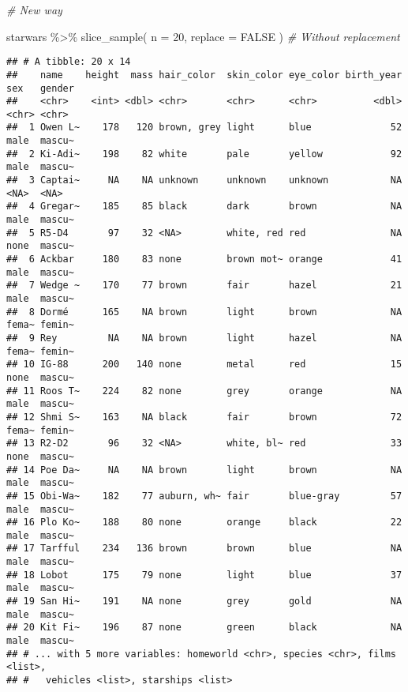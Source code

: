 \documentclass[
]{book}
\newenvironment{Shaded}{\begin{snugshade}}{\end{snugshade}}
\newcommand{\AttributeTok}[1]{\textcolor[rgb]{0.77,0.63,0.00}{#1}}
\newcommand{\CommentTok}[1]{\textcolor[rgb]{0.56,0.35,0.01}{\textit{#1}}}
\newcommand{\ConstantTok}[1]{\textcolor[rgb]{0.00,0.00,0.00}{#1}}
\newcommand{\DecValTok}[1]{\textcolor[rgb]{0.00,0.00,0.81}{#1}}
\newcommand{\FunctionTok}[1]{\textcolor[rgb]{0.00,0.00,0.00}{#1}}
\newcommand{\NormalTok}[1]{#1}
\newcommand{\SpecialCharTok}[1]{\textcolor[rgb]{0.00,0.00,0.00}{#1}}
\begin{document}
\begin{Shaded}
\begin{Highlighting}[]
\CommentTok{\# New way}

\NormalTok{starwars }\SpecialCharTok{\%\textgreater{}\%}
  \FunctionTok{slice\_sample}\NormalTok{(}
    \AttributeTok{n =} \DecValTok{20}\NormalTok{,}
    \AttributeTok{replace =} \ConstantTok{FALSE}
\NormalTok{  ) }\CommentTok{\# Without replacement}
\end{Highlighting}
\end{Shaded}

\begin{verbatim}
## # A tibble: 20 x 14
##    name    height  mass hair_color  skin_color eye_color birth_year sex   gender
##    <chr>    <int> <dbl> <chr>       <chr>      <chr>          <dbl> <chr> <chr> 
##  1 Owen L~    178   120 brown, grey light      blue              52 male  mascu~
##  2 Ki-Adi~    198    82 white       pale       yellow            92 male  mascu~
##  3 Captai~     NA    NA unknown     unknown    unknown           NA <NA>  <NA>  
##  4 Gregar~    185    85 black       dark       brown             NA male  mascu~
##  5 R5-D4       97    32 <NA>        white, red red               NA none  mascu~
##  6 Ackbar     180    83 none        brown mot~ orange            41 male  mascu~
##  7 Wedge ~    170    77 brown       fair       hazel             21 male  mascu~
##  8 Dormé      165    NA brown       light      brown             NA fema~ femin~
##  9 Rey         NA    NA brown       light      hazel             NA fema~ femin~
## 10 IG-88      200   140 none        metal      red               15 none  mascu~
## 11 Roos T~    224    82 none        grey       orange            NA male  mascu~
## 12 Shmi S~    163    NA black       fair       brown             72 fema~ femin~
## 13 R2-D2       96    32 <NA>        white, bl~ red               33 none  mascu~
## 14 Poe Da~     NA    NA brown       light      brown             NA male  mascu~
## 15 Obi-Wa~    182    77 auburn, wh~ fair       blue-gray         57 male  mascu~
## 16 Plo Ko~    188    80 none        orange     black             22 male  mascu~
## 17 Tarfful    234   136 brown       brown      blue              NA male  mascu~
## 18 Lobot      175    79 none        light      blue              37 male  mascu~
## 19 San Hi~    191    NA none        grey       gold              NA male  mascu~
## 20 Kit Fi~    196    87 none        green      black             NA male  mascu~
## # ... with 5 more variables: homeworld <chr>, species <chr>, films <list>,
## #   vehicles <list>, starships <list>
\end{verbatim}
\end{document}
